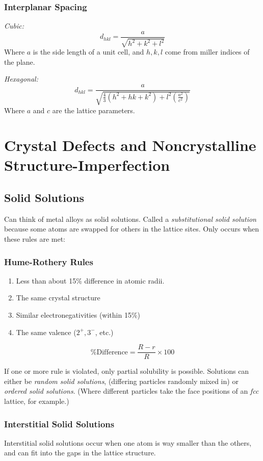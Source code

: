 \documentclass[10pt,letterpaper]{article}
\begin{document}
	\subsubsection*{Interplanar Spacing}
	\textit{Cubic:}
	$$
	d_{hkl} = \frac{a}{\sqrt{h^2 + k^2 + l^2}}
	$$
	Where $a$ is the side length of a unit cell, and $h,k,l$ come from miller indices of the plane. 
	
	\textit{Hexagonal: }
	$$
	d_{hkl} = \frac{a}{\sqrt{\frac{4}{3}(h^2 + hk + k^2)+l^2(\frac{a^2}{c^2})}}
	$$ 
	Where $a$ and $c$ are the lattice parameters. 
	
	
	\section{Crystal Defects and Noncrystalline Structure-Imperfection}
	\subsection{Solid Solutions}
	Can think of metal alloys as solid solutions.  Called a \textit{substitutional solid solution} because some atoms are swapped for others in the lattice sites. Only occurs when these rules are met: 
	\subsubsection{Hume-Rothery Rules}
	\begin{enumerate}
		\item Less than about 15\% difference in atomic radii.
		\item The same crystal structure
		\item Similar electronegativities (within 15\%)
		\item The same valence ($2^+, 3^-$, etc.)
	\end{enumerate}
	$$
	\% \text{Difference} = \frac{R - r}{R} \times 100
	$$
	
	If one or more rule is violated, only partial solubility is possible. Solutions can either be \textit{random solid solutions}, (differing particles randomly mixed in) or \textit{ordered solid solutions}. (Where different particles take the face positions of an \textit{fcc} lattice, for example.)
	
	\subsubsection{Interstitial Solid Solutions}
	Interstitial solid solutions occur when one atom is way smaller than the others, and can fit into the gaps in the lattice structure. 
	
\end{document}
